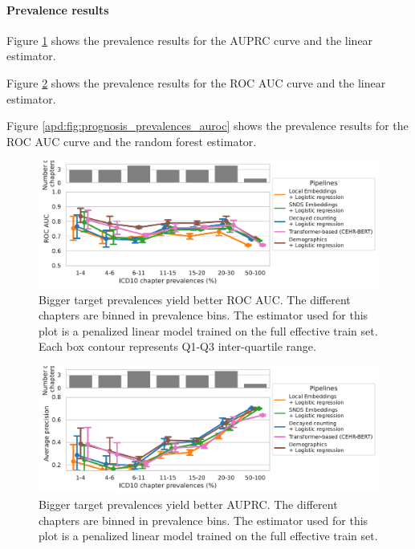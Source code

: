 \documentclass[french,12pt,twoside,a4paper]{book}
\begin{document}
\begin{appendices}
  \paragraph{Prevalence results}\label{apd:prognosis_prevalences}


  Figure \ref{apd:fig:prognosis_prevalences_auprc_linear} shows the prevalence
  results for the AUPRC curve and the linear estimator.

  Figure \ref{apd:fig:prognosis_prevalences_auroc_linear} shows the prevalence
  results for the ROC AUC curve and the linear estimator.

  Figure \ref{apd:fig:prognosis_prevalences_auroc} shows the prevalence results
  for the ROC AUC curve and the random forest estimator.



  \begin{figure}[!h]
    \centering
    \includegraphics[width=0.8\linewidth]{img/chapter_3/prognosis/prevalence_results__est_ridge_boxplot_roc_auc_score_xlog.pdf}
    \caption{Bigger target prevalences yield better ROC AUC. The different
      chapters are binned in prevalence bins. The estimator used for this plot is
      a penalized linear model trained on the full effective train set. Each box
      contour represents Q1-Q3 inter-quartile range.}%
    \label{apd:fig:prognosis_prevalences_auprc_linear}
  \end{figure}


  \begin{figure}[!h]
    \centering
    \includegraphics[width=0.8\linewidth]{img/chapter_3/prognosis/prevalence_results__est_ridge_boxplot_average_precision_score_xlog.pdf}
    \caption{ Bigger target prevalences yield better AUPRC. The different
      chapters are binned in prevalence bins. The estimator used for this plot
      is a penalized linear model trained on the full effective train set.}%
    \label{apd:fig:prognosis_prevalences_auroc_linear}
  \end{figure}



\end{appendices}
\end{document}

